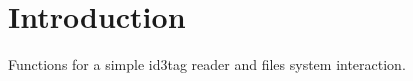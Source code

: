 \hypertarget{index_intro_sec}{}\section{Introduction}\label{index_intro_sec}
Functions for a simple id3tag reader and files system interaction. 
